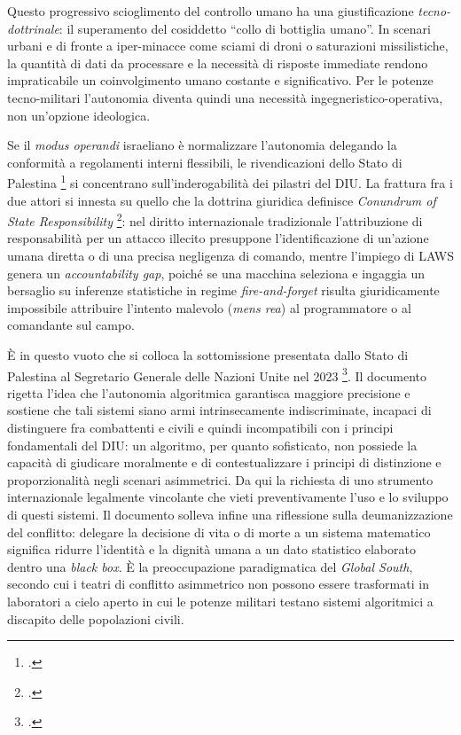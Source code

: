 \documentclass[a4paper,12pt]{report}
\begin{document}
Questo progressivo scioglimento del controllo umano ha una giustificazione
\textit{tecno-dottrinale}: il superamento del cosiddetto ``collo di bottiglia
umano''. In scenari urbani e di fronte a iper-minacce come sciami di droni o
saturazioni missilistiche, la quantità di dati da processare e la necessità di
risposte immediate rendono impraticabile un coinvolgimento umano costante e
significativo. Per le potenze tecno-militari l'autonomia diventa quindi una
necessità ingegneristico-operativa, non un'opzione ideologica.
 
Se il \textit{modus operandi} israeliano è normalizzare l'autonomia delegando la
conformità a regolamenti interni flessibili, le rivendicazioni dello Stato di
Palestina \footcite{palestine_2023} si concentrano sull'inderogabilità dei
pilastri del DIU. La frattura fra i due attori si innesta su quello che la
dottrina giuridica definisce \textit{Conundrum of State Responsibility}
\footcite{state_resp_2025}: nel diritto internazionale tradizionale
l'attribuzione di responsabilità per un attacco illecito presuppone
l'identificazione di un'azione umana diretta o di una precisa negligenza di
comando, mentre l'impiego di LAWS genera un \textit{accountability gap}, poiché
se una macchina seleziona e ingaggia un bersaglio su inferenze statistiche in
regime \textit{fire-and-forget} risulta giuridicamente impossibile attribuire
l'intento malevolo (\textit{mens rea}) al programmatore o al comandante sul
campo.
 
È in questo vuoto che si colloca la sottomissione presentata dallo Stato di
Palestina al Segretario Generale delle Nazioni Unite nel 2023
\footcite{palestine_2023}. Il documento rigetta l'idea che l'autonomia
algoritmica garantisca maggiore precisione e sostiene che tali sistemi siano
armi intrinsecamente indiscriminate, incapaci di distinguere fra combattenti e
civili e quindi incompatibili con i principi fondamentali del DIU: un algoritmo,
per quanto sofisticato, non possiede la capacità di giudicare moralmente e di
contestualizzare i principi di distinzione e proporzionalità negli scenari
asimmetrici. Da qui la richiesta di uno strumento internazionale legalmente
vincolante che vieti preventivamente l'uso e lo sviluppo di questi sistemi. Il
documento solleva infine una riflessione sulla deumanizzazione del conflitto:
delegare la decisione di vita o di morte a un sistema matematico significa
ridurre l'identità e la dignità umana a un dato statistico elaborato dentro una
\textit{black box}. È la preoccupazione paradigmatica del \textit{Global South},
secondo cui i teatri di conflitto asimmetrico non possono essere trasformati in
laboratori a cielo aperto in cui le potenze militari testano sistemi algoritmici
a discapito delle popolazioni civili.
 
\end{document}
